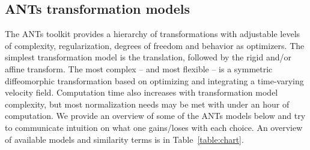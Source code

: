 \documentclass{InsightArticle}
\begin{document}
\subsection{ANTs transformation models}
The ANTs toolkit provides a hierarchy of transformations with
adjustable levels of complexity, regularization, degrees of freedom
and behavior as optimizers.  The simplest transformation model is the
translation, followed by the rigid and/or affine transform.  The most complex -- and most flexible
-- is a symmetric diffeomorphic transformation based on optimizing and
integrating a time-varying velocity field.  Computation time also
increases with transformation model complexity, but most normalization
needs may be met with under an hour of computation.  
We provide an overview of some of the ANTs models below and 
try to communicate intuition on what one gains/loses with each choice.  
An overview of available models and similarity terms is in Table~\ref{table:chart}.
\end{document}
